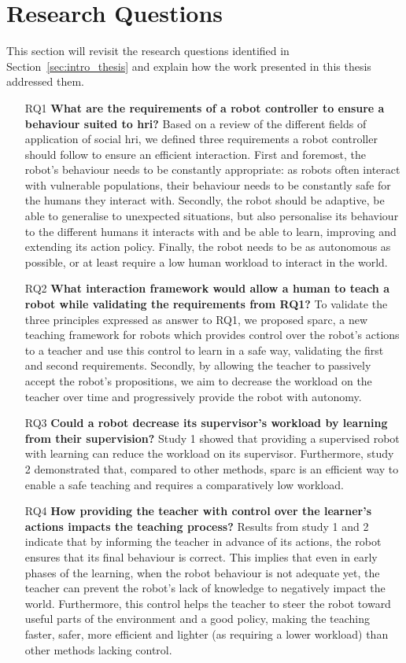 \section{Research Questions} \label{sec:disc_rq}
This section will revisit the research questions identified in Section~\ref{sec:intro_thesis} and explain how the work presented in this thesis addressed them.
\begin{itemize}
\item [RQ1] \textbf{What are the requirements of a robot controller to ensure a behaviour suited to \gls{hri}?} 
Based on a review of the different fields of application of social \gls{hri}, we defined three requirements a robot controller should follow to ensure an efficient interaction. First and foremost, the robot's behaviour needs to be constantly appropriate: as robots often interact with vulnerable populations, their behaviour needs to be constantly safe for the humans they interact with. Secondly, the robot should be adaptive, be able to generalise to unexpected situations, but also personalise its behaviour to the different humans it interacts with and be able to learn, improving and extending its action policy. Finally, the robot needs to be as autonomous as possible, or at least require a low human workload to interact in the world.

\item [RQ2] \textbf{What interaction framework would allow a human to teach a robot while validating the requirements from RQ1?}
To validate the three principles expressed as answer to RQ1, we proposed \gls{sparc}, a new teaching framework for robots which provides control over the robot's actions to a teacher and use this control to learn in a safe way, validating the first and second requirements. Secondly, by allowing the teacher to passively accept the robot's propositions, we aim to decrease the workload on the teacher over time and progressively provide the robot with autonomy. 

\item [RQ3] \textbf{Could a robot decrease its supervisor's workload by learning from their supervision?}
Study 1 showed that providing a supervised robot with learning can reduce the workload on its supervisor. Furthermore, study 2 demonstrated that, compared to other methods, \gls{sparc} is an efficient way to enable a safe teaching and requires a comparatively low workload.

\item [RQ4] \textbf{How providing the teacher with control over the learner's actions impacts the teaching process?} 
Results from study 1 and 2 indicate that by informing the teacher in advance of its actions, the robot ensures that its final behaviour is correct. This implies that even in early phases of the learning, when the robot behaviour is not adequate yet, the teacher can prevent the robot's lack of knowledge to negatively impact the world. Furthermore, this control helps the teacher to steer the robot toward useful parts of the environment and a good policy, making the teaching faster, safer, more efficient and lighter (as requiring a lower workload) than other methods lacking control.


\end{itemize}
